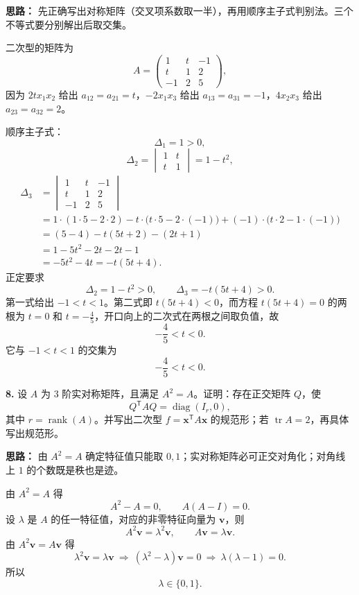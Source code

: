 \ifshowsolutions%

\textbf{思路：} 先正确写出对称矩阵（交叉项系数取一半），再用顺序主子式判别法。三个不等式要分别解出后取交集。

二次型的矩阵为
\[
A=\begin{pmatrix}
1&t&-1\\
t&1&2\\
-1&2&5
\end{pmatrix},
\]
因为 \(2tx_1x_2\) 给出 \(a_{12}=a_{21}=t\)，\(-2x_1x_3\) 给出 \(a_{13}=a_{31}=-1\)，\(4x_2x_3\) 给出 \(a_{23}=a_{32}=2\)。

顺序主子式：
\[
\Delta_1=1>0,
\]
\[
\Delta_2=\begin{vmatrix}1&t\\t&1\end{vmatrix}=1-t^2,
\]
\[
\begin{aligned}
\Delta_3
&=\begin{vmatrix}
1&t&-1\\
t&1&2\\
-1&2&5
\end{vmatrix}\\
&=1\cdot(1\cdot5-2\cdot2)
-t\cdot\bigl(t\cdot5-2\cdot(-1)\bigr)
+(-1)\cdot\bigl(t\cdot2-1\cdot(-1)\bigr)\\
&=(5-4)-t(5t+2)-(2t+1)\\
&=1-5t^2-2t-2t-1\\
&=-5t^2-4t=-t(5t+4).
\end{aligned}
\]
正定要求
\[
\Delta_2=1-t^2>0,\qquad \Delta_3=-t(5t+4)>0.
\]
第一式给出 \(-1<t<1\)。第二式即 \(t(5t+4)<0\)，而方程 \(t(5t+4)=0\) 的两根为 \(t=0\) 和 \(t=-\frac45\)，开口向上的二次式在两根之间取负值，故
\[
-\frac45<t<0.
\]
它与 \(-1<t<1\) 的交集为
\[
-\frac45<t<0.
\]

\else \answerarea[10] \fi%

\textbf{8.} 设 \(A\) 为 \(3\) 阶实对称矩阵，且满足 \(A^2=A\)。证明：存在正交矩阵 \(Q\)，使
\[
Q^{\mathsf T}AQ=\operatorname{diag}(I_r,0),
\]
其中 \(r=\operatorname{rank}(A)\)。并写出二次型 \(f=\mathbf{x}^{\mathsf T}A\mathbf{x}\) 的规范形；若 \(\operatorname{tr}A=2\)，再具体写出规范形。

\ifshowsolutions%

\textbf{思路：} 由 \(A^2=A\) 确定特征值只能取 \(0,1\)；实对称矩阵必可正交对角化；对角线上 \(1\) 的个数既是秩也是迹。

由 \(A^2=A\) 得
\[
A^2-A=0,\qquad A(A-I)=0.
\]
设 \(\lambda\) 是 \(A\) 的任一特征值，对应的非零特征向量为 \(\mathbf{v}\)，则
\[
A^2\mathbf{v}=\lambda^2\mathbf{v},\qquad A\mathbf{v}=\lambda\mathbf{v}.
\]
由 \(A^2\mathbf{v}=A\mathbf{v}\) 得
\[
\lambda^2\mathbf{v}=\lambda\mathbf{v}
\ \Longrightarrow\ (\lambda^2-\lambda)\mathbf{v}=0
\ \Longrightarrow\ \lambda(\lambda-1)=0.
\]
所以
\[
\lambda\in\{0,1\}.
\]

